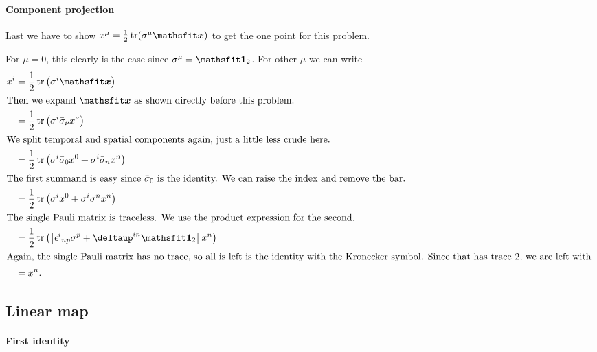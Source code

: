 \documentclass[11pt, english, fleqn, DIV=15, headinclude, BCOR=1cm]{scrartcl}
\begin{document}
\paragraph{Component projection}

Last we have to show $x^\mu = \frac12 \tr(\sigma^\mu \tens x)$ to get the one
point for this problem.

For $\mu = 0$, this clearly is the case since $\sigma^\mu = \tens 1_2$. For
other $\mu$ we can write
\begin{align*}
    x^i &= \frac12 \tr\del{\sigma^i \tens x} \\
    \intertext{%
        Then we expand $\tens x$ as shown directly before this problem.
    }
    &= \frac12 \tr\del{\sigma^i \bar\sigma_\nu x^\nu} \\
    \intertext{%
        We split temporal and spatial components again, just a little less
        crude here.
    }
    &= \frac12 \tr\del{\sigma^i \bar\sigma_0 x^0 + \sigma^i \bar\sigma_n x^n} \\
    \intertext{%
        The first summand is easy since $\bar\sigma_0$ is the identity. We can
        raise the index and remove the bar.
    }
    &= \frac12 \tr\del{\sigma^i x^0 + \sigma^i \sigma^n x^n} \\
    \intertext{%
        The single Pauli matrix is traceless. We use the product expression for
        the second.
    }
    &= \frac12 \tr\del{\sbr{\epsilon^i{}_{np} \sigma^p + \deltaup^{in} \tens
    1_2} x^n} \\
    \intertext{%
        Again, the single Pauli matrix has no trace, so all is left is the
        identity with the Kronecker symbol. Since that has trace 2, we are left
        with
    }
    &= x^n.
\end{align*}

\subsection{Linear map}

\paragraph{First identity}
\end{document}

